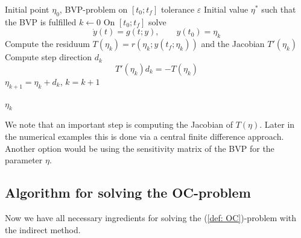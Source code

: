 \documentclass[a4paper]{article}
\theoremstyle{definitions}
\theoremstyle{bemerkung}
\theoremstyle{satz}
\theoremstyle{satz}
\begin{document}
    \begin{algorithm}[h]
        
        \caption{Single Shooting for BVP}
        \label{alg:Single Shooting}
        \begin{algorithmic}[1]
            \Require Initial point $\eta_0$, BVP-problem on $[t_0;t_f]$ tolerance $\varepsilon$
            \Ensure Initial value $\eta^*$ such that the BVP is fulfilled
            \State $k \gets 0$
                \State On $[t_0;t_f]$ solve 
                    \[\dot{y}(t) = g(t;y), \qquad y(t_0) = \eta_k\]
                \State Compute the residuum $T(\eta_k) = r(\eta_k; y(t_f;\eta_k))$ and the Jacobian $T'(\eta_k)$
                \State Compute step direction $d_k$ 
                \[T'(\eta_k)d_k = -T(\eta_k)\]
                \State $\eta_{k+1} = \eta_k + d_k$, $k = k+1$
            \EndWhile

            \State \Return $\eta_k$
        \end{algorithmic}
    \end{algorithm}

    We note that an important step is computing the Jacobian of $T(\eta)$. Later in the numerical examples this is done via a central finite difference approach. Another option would be using the sensitivity matrix of the BVP for the parameter $\eta$.

    \subsection{Algorithm for solving the OC-problem}

    Now we have all necessary ingredients for solving the (\ref{def: OC})-problem with the indirect method.
\end{document}
